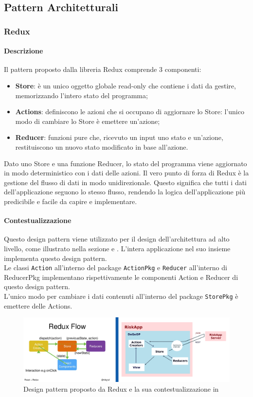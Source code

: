 \newpage
\subsection{Pattern Architetturali}
\subsubsection{Redux}
\label{dp_redux} %
\paragraph{Descrizione}
Il pattern proposto dalla libreria Redux comprende 3 componenti:
\begin{itemize}
	\item \textbf{Store}: è un unico oggetto globale read-only che contiene i dati da gestire, memorizzando l'intero stato del programma;
	\item \textbf{Actions}: definiscono le azioni che si occupano di aggiornare lo Store: l'unico modo di cambiare lo Store è emettere un'azione;
	\item \textbf{Reducer}: funzioni pure che, ricevuto un input uno stato e un'azione, restituiscono un nuovo stato modificato in base all'azione.
\end{itemize}
Dato uno Store e una funzione Reducer, lo stato del programma viene aggiornato in modo deterministico con i dati delle azioni.
Il vero punto di forza di Redux è la gestione del flusso di dati in modo unidirezionale. Questo significa che tutti i dati dell'applicazione seguono lo stesso flusso, rendendo la logica dell'applicazione più predicibile e facile da capire e implementare.
\paragraph{Contestualizzazione}
Questo design pattern viene utilizzato per il design dell'architettura ad alto livello, come illustrato nella sezione  e . L'intera applicazione nel suo insieme implementa questo design pattern.
\\Le classi \texttt{Action} all'interno del package \texttt{ActionPkg} e \texttt{Reducer} all'interno di ReducerPkg implementano rispettivamente le componenti Action e Reducer di questo design pattern.
\\L'unico modo per cambiare i dati contenuti all'interno del package \texttt{StorePkg} è emettere delle Actions.
	\begin{figure}[H]
		\label{redux_compara}
		\centering
		\includegraphics[scale=0.3]{img/ComparaArch.png}
		\caption{Design pattern proposto da Redux e la sua contestualizzazione in \progetto}
	\end{figure}